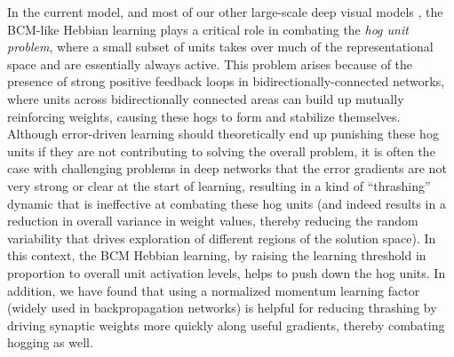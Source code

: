 \documentclass[11pt,twoside]{article}
\newif\myifpdf
\begin{document}
In the current model, and most of our other large-scale deep visual models \cite{OReillyWyatteHerdEtAl13}, the BCM-like Hebbian learning plays a critical role in combating the {\em hog unit problem}, where a small subset of units takes over much of the representational space and are essentially always active.  This problem arises because of the presence of strong positive feedback loops in bidirectionally-connected networks, where units across bidirectionally connected areas can build up mutually reinforcing weights, causing these hogs to form and stabilize themselves.  Although error-driven learning should theoretically end up punishing these hog units if they are not contributing to solving the overall problem, it is often the case with challenging problems in deep networks that the error gradients are not very strong or clear at the start of learning, resulting in a kind of ``thrashing'' dynamic that is ineffective at combating these hog units (and indeed results in a reduction in overall variance in weight values, thereby reducing the random variability that drives exploration of different regions of the solution space).  In this context, the BCM Hebbian learning, by raising the learning threshold in proportion to overall unit activation levels, helps to push down the hog units.  In addition, we have found that using a normalized momentum learning factor (widely used in backpropagation networks) is helpful for reducing thrashing by driving synaptic weights more quickly along useful gradients, thereby combating hogging as well.
\end{document}
